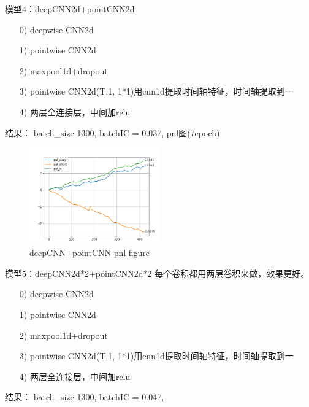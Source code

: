 \documentclass[11pt]{ctexart}
\begin{document}
模型4：deepCNN2d+pointCNN2d
\begin{itemize}
  \item [0)]
  deepwise CNN2d
  \item [1)]
  pointwise CNN2d
  \item [2)]
  maxpool1d+dropout
  \item [3)]
  pointwise CNN2d(T,1, 1*1)用cnn1d提取时间轴特征，时间轴提取到一
  \item [4)]
  两层全连接层，中间加relu

\end{itemize}
结果： batch\_size 1300, batchIC = 0.037,
pnl图(7epoch)
\begin{figure}[h!]
\begin{center}
\includegraphics[width=0.5\textwidth]{3.PNG}
\end{center}
\caption{deepCNN+pointCNN pnl figure}
\label{FIG.5}
\end{figure}


模型5：deepCNN2d*2+pointCNN2d*2
每个卷积都用两层卷积来做，效果更好。
\begin{itemize}
  \item [0)]
  deepwise CNN2d
  \item [1)]
  pointwise CNN2d
  \item [2)]
  maxpool1d+dropout
  \item [3)]
  pointwise CNN2d(T,1, 1*1)用cnn1d提取时间轴特征，时间轴提取到一
  \item [4)]
  两层全连接层，中间加relu

\end{itemize}
结果： batch\_size 1300, batchIC = 0.047,
\end{document}

